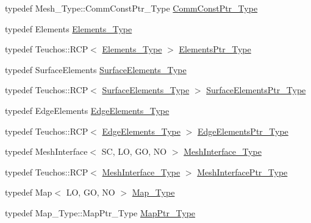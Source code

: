 \begin{DoxyCompactItemize}
\item 
typedef Mesh\+\_\+\+Type\+::\+Comm\+Const\+Ptr\+\_\+\+Type \hyperlink{classFEDD_1_1AdaptiveMeshRefinement_a6bd5089532bd8dac39bebc4a92e33c40}{Comm\+Const\+Ptr\+\_\+\+Type}
\item 
typedef Elements \hyperlink{classFEDD_1_1AdaptiveMeshRefinement_ae08f7ca72876c1aba944120b3ca088d3}{Elements\+\_\+\+Type}
\item 
typedef Teuchos\+::\+R\+CP$<$ \hyperlink{classFEDD_1_1AdaptiveMeshRefinement_ae08f7ca72876c1aba944120b3ca088d3}{Elements\+\_\+\+Type} $>$ \hyperlink{classFEDD_1_1AdaptiveMeshRefinement_a9a08c5e3801ff9f9f3dff7997f9f4b1b}{Elements\+Ptr\+\_\+\+Type}
\item 
typedef Surface\+Elements \hyperlink{classFEDD_1_1AdaptiveMeshRefinement_afa6eaf74293132701460f9107ce0c070}{Surface\+Elements\+\_\+\+Type}
\item 
typedef Teuchos\+::\+R\+CP$<$ \hyperlink{classFEDD_1_1AdaptiveMeshRefinement_afa6eaf74293132701460f9107ce0c070}{Surface\+Elements\+\_\+\+Type} $>$ \hyperlink{classFEDD_1_1AdaptiveMeshRefinement_aabda3ef3658f8847265104c6cf9a3877}{Surface\+Elements\+Ptr\+\_\+\+Type}
\item 
typedef Edge\+Elements \hyperlink{classFEDD_1_1AdaptiveMeshRefinement_a891870bd161746dd633e1c8126d8fea1}{Edge\+Elements\+\_\+\+Type}
\item 
typedef Teuchos\+::\+R\+CP$<$ \hyperlink{classFEDD_1_1AdaptiveMeshRefinement_a891870bd161746dd633e1c8126d8fea1}{Edge\+Elements\+\_\+\+Type} $>$ \hyperlink{classFEDD_1_1AdaptiveMeshRefinement_a495f60e86da92289b7fe1c15e291660d}{Edge\+Elements\+Ptr\+\_\+\+Type}
\item 
typedef Mesh\+Interface$<$ SC, LO, GO, NO $>$ \hyperlink{classFEDD_1_1AdaptiveMeshRefinement_a2d24dca5502ca055019d31c569bf003e}{Mesh\+Interface\+\_\+\+Type}
\item 
typedef Teuchos\+::\+R\+CP$<$ \hyperlink{classFEDD_1_1AdaptiveMeshRefinement_a2d24dca5502ca055019d31c569bf003e}{Mesh\+Interface\+\_\+\+Type} $>$ \hyperlink{classFEDD_1_1AdaptiveMeshRefinement_a5d1f62bff0822daa8f0b7caf3e3b4311}{Mesh\+Interface\+Ptr\+\_\+\+Type}
\item 
typedef Map$<$ LO, GO, NO $>$ \hyperlink{classFEDD_1_1AdaptiveMeshRefinement_af60419a5ef8a4785991b704d1ad7aacb}{Map\+\_\+\+Type}
\item 
typedef Map\+\_\+\+Type\+::\+Map\+Ptr\+\_\+\+Type \hyperlink{classFEDD_1_1AdaptiveMeshRefinement_a751bcbe2e4fddcdcde836067b776d42d}{Map\+Ptr\+\_\+\+Type}
\item 

\end{DoxyCompactItemize}
